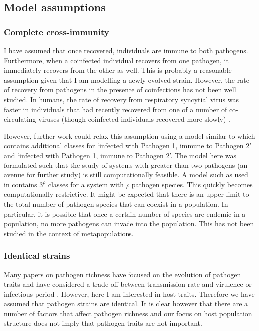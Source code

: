 \subsection{Model assumptions}

\subsubsection{Complete cross-immunity}

I have assumed that once recovered, individuals are immune to both pathogens. 
Furthermore, when a coinfected individual recovers from one pathogen, it immediately recovers from the other as well.
This is probably a reasonable assumption given that I am modelling a newly evolved strain.
However, the rate of recovery from pathogens in the presence of coinfections has not been well studied.
In humans, the rate of recovery from respiratory syncytial virus was faster in individuals that had recently recovered from one of a number of co-circulating viruses (though coinfected individuals recovered more slowly) \cite{munywoki2015influence}.

However, further work could relax this assumption using a model similar to \cite{poletto2015characterising} which contains additional classes for `infected with Pathogen 1, immune to Pathogen 2' and `infected with Pathogen 1, immune to Pathogen 2'.
The model here was formulated such that the study of systems with greater than two pathogens (an avenue for further study) is still computationally feasible. 
A model such as used in \cite{poletto2015characterising} contains $3^\rho$ classes for a system with $\rho$ pathogen species.
This quickly becomes computationally restrictive.
It might be expected that there is an upper limit to the total number of pathogen species that can coexist in a population.
In particular, it is possible that once a certain number of species are endemic in a population, no more pathogens can invade into the population.
This has not been studied in the context of metapopulations.

\subsubsection{Identical strains}

Many papers on pathogen richness have focused on the evolution of pathogen traits and have considered a trade-off between transmission rate and virulence \cite{nowak1994superinfection, nowak1994superinfection} or infectious period \cite{poletto2013host}.
However, here I am interested in host traits.
Therefore we have assumed that pathogen strains are identical.
It is clear however that there are a number of factors that affect pathogen richness and our focus on host population structure does not imply that pathogen traits are not important.

